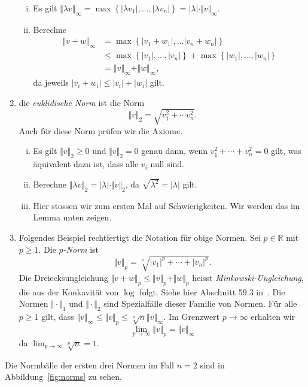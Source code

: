 \documentclass[../main.tex]{subfiles}
\begin{document}
\begin{examples}
\begin{enumerate}[(1)]
\begin{enumerate}[(i)]
        \item Es gilt $\Vert \lambda v \Vert_{\infty}
          = \max \left\{|\lambda v_1|, \dots, |\lambda v_n|\right\} = |\lambda|
          \cdot \Vert v \Vert_\infty$.
        \item Berechne
          \begin{align*}
            \Vert v + w \Vert_\infty
            &= \max \left\{|v_1 + w_1|, \dots |v_n + w_n|\right\} \\
            &\leq \max \left\{|v_{1}|, \dots, |v_{n}|\right\}
            + \max \left\{|w_{1}|, \dots, |w_{n}|\right\} \\
            &= \Vert v \Vert_{\infty} + \Vert w \Vert_{\infty},
          \end{align*}
          da jeweils $|v_i + w_i| \leq |v_i| + |w_i| $ gilt.
      \end{enumerate}
    \item die \emph{euklidische Norm} ist die Norm
      \[
        \Vert v \Vert_2 = \sqrt{v_1^2 + \cdots v_n^2}.
      \]
      Auch für diese Norm prüfen wir die Axiome.
      \begin{enumerate}[(i)]
        \item Es gilt $\Vert v \Vert_2 \geq 0$ und
          $\Vert v \Vert_2 = 0$ genau dann, wenn
          $v_1^2 + \cdots + v_n^2 = 0$ gilt,
          was äquivalent dazu ist, dass alle $v_i$ null sind.
        \item Berechne $\Vert \lambda v \Vert_2 = |\lambda | \cdot
          \Vert v \Vert_2$, da $\sqrt{\lambda^2} = |\lambda|$ gilt.
        \item Hier stossen wir zum ersten Mal auf Schwierigkeiten.
          Wir werden das im Lemma unten zeigen.
      \end{enumerate}
    \item 
      Folgendes Beispiel rechtfertigt die Notation
      für obige Normen. Sei $p \in \mathbb{R}$ mit $p \geq 1$. 
      Die \emph{$p$-Norm} ist
       \[
         \Vert v \Vert_p = \sqrt[p]{|v_1|^p + \cdots + |v_n|^p}.
      \]
      Die Dreiecksungleichung $\Vert v + w \Vert_p \leq
      \Vert v \Vert_p + \Vert w \Vert_p$ heisst
      \emph{Minkowski-Ungleichung}, die aus der
      Konkavität von $\log$ folgt. Siehe hier Abschnitt
      59.3 in~\cite{heuser}.
      Die Normen $\Vert \cdot \Vert_1$ und $\Vert \cdot \Vert_2$ 
      sind Spezialfälle dieser Familie von Normen.
      Für alle $p \geq 1$ gilt, dass $\Vert v \Vert_{\infty}
      \leq \Vert v \Vert_p \leq \sqrt[p]{n} \Vert v \Vert_{\infty}$.
      Im Grenzwert $p \to \infty$ erhalten wir
      \[
        \lim_{p \to \infty} \Vert v \Vert_p = \Vert v \Vert_{\infty}
      \]
      da $\lim_{p \to \infty} \sqrt[p]{n} = 1$.
  \end{enumerate}
  Die Normbälle der ersten drei Normen im Fall $n = 2$
  sind in Abbildung~\ref{fig:norms}
  zu sehen.
\end{examples}
\end{document}
